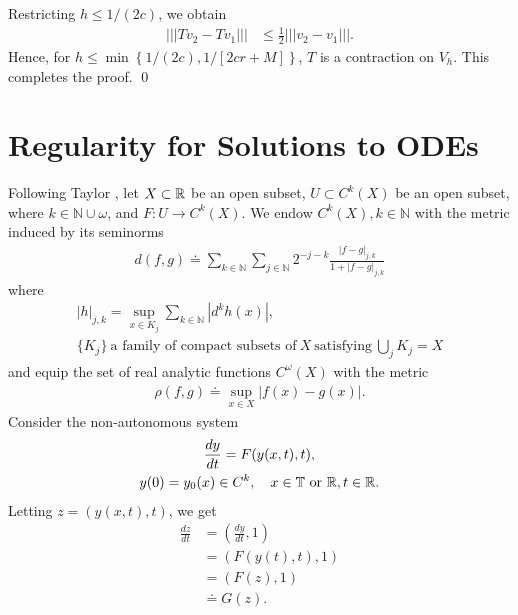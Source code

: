 %
%
Restricting $h \le 1/(2c)$, we obtain
\begin{equation*}
	\begin{split}
		| | | Tv_2 - Tv_1 | | | & \le \frac{1}{2} | | | v_2 - v_1 | | |. 
	\end{split}
\end{equation*}
Hence, for $h \le \min\left\{1/(2c), 1/[2cr + M] \right\}$, $T$ is a
contraction on $V_h$. This completes the proof. \qed
%
%
%
%
%
%
%
\section{Regularity for Solutions to ODEs} 
\label{sec:dep-param}
%
%
Following Taylor \cite{Taylor:1995kx}, let $X \subset \mathbb{R}$ be an open subset,
$U \subset C^{k}(X)$ be an open subset, where $k \in \mathbb{N}\cup \omega$, and
$F: U \to C^{k}(X)$. We endow $C^{k}(X), k \in \mathbb{N}$ with the metric
induced by its seminorms
%
%
\begin{equation*}
\begin{split}
d(f, g) \doteq \sum_{k \in \mathbb{N}} \sum_{j \in \mathbb{N}} 2^{-j -k} \frac{|
f-g |_{j, k}}{1 + | f-g |_{j, k}}
\end{split}
\end{equation*}
%
where
%
%
\begin{gather*}
|h|_{j,k}  = \sup_{x \in K_j} \sum_{k \in \mathbb{N}} |d^{k}h(x)|,
\\
\{ K_{j} \} \ \text{a family of compact subsets of} \ X \  \text{satisfying} \ \bigcup_{j} K_{j} = X 
\end{gather*}
%
%
%
and equip the set of real analytic functions $C^{\omega}(X)$ with the
metric
%
%
\begin{equation*}
\begin{split}
\rho(f,g) \doteq \sup_{x \in X} |f(x) - g(x)|.
\end{split}
\end{equation*}
%
%
Consider the non-autonomous system
%
%
\begin{gather}
  \label{aa}
\frac{dy}{dt} = F(y(x,t), t),
\\
y(0)= y_{0}(x) \in C^{k}, \quad x \in \mathbb{T} \ \text{or} \ \mathbb{R},t \in \mathbb{R}.
\label{bb}
\end{gather}
%
Letting $z = (y(x,t), t)$, we get
%
%
\begin{equation*}
\begin{split}
\frac{dz}{dt}  
& = \left (\frac{dy}{dt}, 1 \right )
\\
& = \left( F(y(t), t), 1 \right)
\\
& = \left( F(z), 1 \right)
\\
& \doteq G(z).
\end{split}
\end{equation*}
